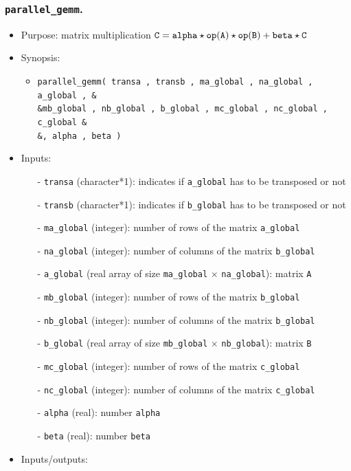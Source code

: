 \documentclass[12pt]{article}
\begin{document}
\subsubsection{{\tt parallel\_gemm}.}
\begin{itemize}
\item Purpose: matrix multiplication ${\tt C = alpha \star op( A ) \star op( B ) + beta \star C}$
\item Synopsis: 
\begin{itemize}
\item {\tt parallel\_gemm( transa , transb , ma\_global , na\_global , a\_global , \& \\ \&mb\_global , nb\_global , b\_global , mc\_global , nc\_global , c\_global \& \\ \&, alpha , beta )}
\end{itemize}
\item Inputs: 
\begin{itemize}
\item[-] {\tt transa} (character*1): indicates if {\tt a\_global} has to be transposed or not
\item[-] {\tt transb} (character*1): indicates if {\tt b\_global} has to be transposed or not
\item[-] {\tt ma\_global} (integer): number of rows of the matrix {\tt a\_global}
\item[-] {\tt na\_global} (integer): number of columns of the matrix {\tt b\_global}
\item[-] {\tt a\_global} (real array of size {\tt ma\_global} $\times$ {\tt na\_global}): matrix {\tt A}
\item[-] {\tt mb\_global} (integer): number of rows of the matrix {\tt b\_global}
\item[-] {\tt nb\_global} (integer): number of columns of the matrix {\tt b\_global}
\item[-] {\tt b\_global} (real array of size {\tt mb\_global} $\times$ {\tt nb\_global}): matrix {\tt B}
\item[-] {\tt mc\_global} (integer): number of rows of the matrix {\tt c\_global}
\item[-] {\tt nc\_global} (integer): number of columns of the matrix {\tt c\_global}
\item[-] {\tt alpha} (real): number {\tt alpha}
\item[-] {\tt beta} (real): number {\tt beta}
\end{itemize}
\item Inputs/outputs: 
\begin{itemize}

\end{itemize}
\end{itemize}
\end{document}
